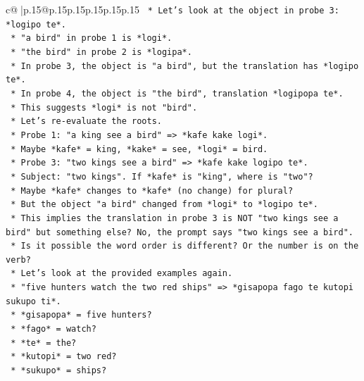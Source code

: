 \documentclass{article}
\begin{document}
{\begin{supertabular}{c@{$\;$}|p{.15\linewidth}@{}p{.15\linewidth}p{.15\linewidth}p{.15\linewidth}p{.15\linewidth}p{.15\linewidth}}
{{{\texttt{            *   Let's look at the object in probe 3: *logipo te*.} \\
\texttt{            *   "a bird" in probe 1 is *logi*.} \\
\texttt{            *   "the bird" in probe 2 is *logipa*.} \\
\texttt{            *   In probe 3, the object is "a bird", but the translation has *logipo te*.} \\
\texttt{            *   In probe 4, the object is "the bird", translation *logipopa te*.} \\
\texttt{            *   This suggests *logi* is not "bird".} \\
\texttt{            *   Let's re{-}evaluate the roots.} \\
\texttt{            *   Probe 1: "a king see a bird" => *kafe kake logi*.} \\
\texttt{                *   Maybe *kafe* = king, *kake* = see, *logi* = bird.} \\
\texttt{            *   Probe 3: "two kings see a bird" => *kafe kake logipo te*.} \\
\texttt{                *   Subject: "two kings". If *kafe* is "king", where is "two"?} \\
\texttt{                *   Maybe *kafe* changes to *kafe* (no change) for plural?} \\
\texttt{                *   But the object "a bird" changed from *logi* to *logipo te*.} \\
\texttt{                *   This implies the translation in probe 3 is NOT "two kings see a bird" but something else? No, the prompt says "two kings see a bird".} \\
\texttt{                *   Is it possible the word order is different? Or the number is on the verb?} \\
\texttt{                *   Let's look at the provided examples again.} \\
\texttt{                *   "five hunters watch the two red ships" => *gisapopa fago te kutopi sukupo ti*.} \\
\texttt{                    *   *gisapopa* = five hunters?} \\
\texttt{                    *   *fago* = watch?} \\
\texttt{                    *   *te* = the?} \\
\texttt{                    *   *kutopi* = two red?} \\
\texttt{                    *   *sukupo* = ships?} \\
}}}
\end{supertabular}}
\end{document}
